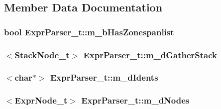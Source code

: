 \subsection{Member Data Documentation}
\hypertarget{classExprParser__t_a128540ad6f861a13a651a5a605bc51bf}{
\subsubsection[{m\-\_\-b\-Has\-Zonespanlist}]{\setlength{\rightskip}{0pt plus 5cm}bool Expr\-Parser\-\_\-t\-::m\-\_\-b\-Has\-Zonespanlist}}\label{classExprParser__t_a128540ad6f861a13a651a5a605bc51bf}
\hypertarget{classExprParser__t_a088cd58a0ec9a5668d3777ae487ce564}{
\subsubsection[{m\-\_\-d\-Gather\-Stack}]{$<${\bf Stack\-Node\-\_\-t}$>$ Expr\-Parser\-\_\-t\-::m\-\_\-d\-Gather\-Stack\hspace{0.3cm}{\ttfamily [private]}}}\label{classExprParser__t_a088cd58a0ec9a5668d3777ae487ce564}
\hypertarget{classExprParser__t_a13189365df48da1f8410f1f7742d2ded}{
\subsubsection[{m\-\_\-d\-Idents}]{$<$char$\ast$$>$ Expr\-Parser\-\_\-t\-::m\-\_\-d\-Idents\hspace{0.3cm}{\ttfamily [private]}}}\label{classExprParser__t_a13189365df48da1f8410f1f7742d2ded}
\hypertarget{classExprParser__t_aa073e2efec96d566f99e165a6cbebc1e}{
\subsubsection[{m\-\_\-d\-Nodes}]{$<${\bf Expr\-Node\-\_\-t}$>$ Expr\-Parser\-\_\-t\-::m\-\_\-d\-Nodes\hspace{0.3cm}{\ttfamily [private]}}}\label{classExprParser__t_aa073e2efec96d566f99e165a6cbebc1e}
